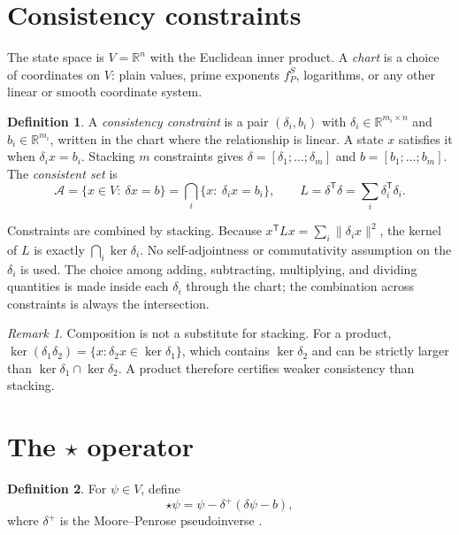 \documentclass[11pt,letterpaper]{article}
\theoremstyle{plain}
\theoremstyle{definition}
\newtheorem{definition}{Definition}
\theoremstyle{remark}
\newtheorem{remark}{Remark}
\newcommand{\R}{\mathbb{R}}
\newcommand{\norm}[1]{\lVert #1\rVert}
\newcommand{\pinv}{^{+}}
\newcommand{\tr}{^{\mathsf T}}
\newcommand{\fP}{f_{P}}
\begin{document}
\section{Consistency constraints}\label{sec:constraints}

The state space is $V=\R^{n}$ with the Euclidean inner product. A \emph{chart} is a choice of coordinates on $V$: plain values, prime exponents $\fP^{S}$, logarithms, or any other linear or smooth coordinate system.

\begin{definition}
A \emph{consistency constraint} is a pair $(\delta_i,b_i)$ with $\delta_i\in\R^{m_i\times n}$ and $b_i\in\R^{m_i}$, written in the chart where the relationship is linear. A state $x$ satisfies it when $\delta_i x=b_i$. Stacking $m$ constraints gives $\delta=[\delta_1;\dots;\delta_m]$ and $b=[b_1;\dots;b_m]$. The \emph{consistent set} is
\[
\mathcal{A}=\{x\in V:\ \delta x=b\}=\bigcap_{i}\{x:\ \delta_i x=b_i\},
\qquad L=\delta\tr\delta=\sum_i\delta_i\tr\delta_i .
\]
\end{definition}

Constraints are combined by stacking. Because $x\tr Lx=\sum_i\norm{\delta_i x}^{2}$, the kernel of $L$ is exactly $\bigcap_i\ker\delta_i$. No self-adjointness or commutativity assumption on the $\delta_i$ is used. The choice among adding, subtracting, multiplying, and dividing quantities is made inside each $\delta_i$ through the chart; the combination across constraints is always the intersection.

\begin{remark}
Composition is not a substitute for stacking. For a product, $\ker(\delta_1\delta_2)=\{x:\delta_2x\in\ker\delta_1\}$, which contains $\ker\delta_2$ and can be strictly larger than $\ker\delta_1\cap\ker\delta_2$. A product therefore certifies weaker consistency than stacking.
\end{remark}

\section{The \texorpdfstring{$\star$}{star} operator}\label{sec:star}

\begin{definition}
For $\psi\in V$, define
\[
\star\psi=\psi-\delta\pinv(\delta\psi-b),
\]
where $\delta\pinv$ is the Moore--Penrose pseudoinverse \cite{penrose,benisrael}.
\end{definition}
\end{document}
